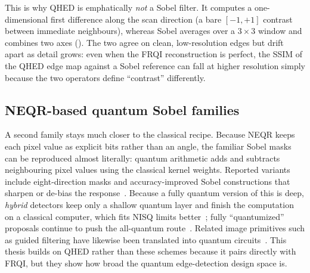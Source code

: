 This is why QHED is emphatically \emph{not} a Sobel filter. It computes a one-dimensional first difference along the scan direction (a bare $[-1,+1]$ contrast between immediate neighbours), whereas Sobel averages over a $3\times 3$ window and combines two axes (). The two agree on clean, low-resolution edges but drift apart as detail grows: even when the FRQI reconstruction is perfect, the SSIM of the QHED edge map against a Sobel reference can fall at higher resolution simply because the two operators define ``contrast'' differently.

\subsection{NEQR-based quantum Sobel families}
A second family stays much closer to the classical recipe. Because NEQR keeps each pixel value as explicit bits rather than an angle, the familiar Sobel masks can be reproduced almost literally: quantum arithmetic adds and subtracts neighbouring pixel values using the classical kernel weights. Reported variants include eight-direction masks and accuracy-improved Sobel constructions that sharpen or de-bias the response~\cite{Fan2019SobelNEQR,Chetia2021ImprovedSobelNEQR,Liu2022EightDirectionSobelNEQR}. Because a fully quantum version of this is deep, \emph{hybrid} detectors keep only a shallow quantum layer and finish the computation on a classical computer, which fits NISQ limits better~\cite{Geng2022HybridNISQEdge}; fully ``quantumized'' proposals continue to push the all-quantum route~\cite{Shubha2024EdgeDetectionQuantumized}. Related image primitives such as guided filtering have likewise been translated into quantum circuits~\cite{Mu2025GuidedImageFiltering}. This thesis builds on QHED rather than these schemes because it pairs directly with FRQI, but they show how broad the quantum edge-detection design space is.

